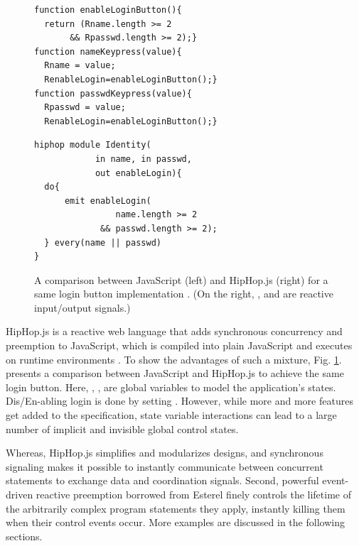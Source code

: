 \documentclass[acmsmall,review,anonymous]{acmart}\settopmatter{printfolios=true,printccs=false,printacmref=false}
\newcommand\figref[1]{Fig. \textcolor{black}{\ref{#1}}.}
\begin{document}
\begin{figure}[h]
\noindent
   \vspace{-2mm}
\begin{varwidth}{.5\textwidth}
\begin{lstlisting}
function enableLoginButton(){
  return (Rname.length >= 2 
	   && Rpasswd.length >= 2);}
function nameKeypress(value){
  Rname = value;
  RenableLogin=enableLoginButton();}
function passwdKeypress(value){ 
  Rpasswd = value;
  RenableLogin=enableLoginButton();}
\end{lstlisting}
\end{varwidth}%
\begin{varwidth}{.5\textwidth}
\begin{lstlisting}
hiphop module Identity(
			in name, in passwd, 
			out enableLogin){
  do{
	  emit enableLogin(
		  		name.length >= 2 
		  	 && passwd.length >= 2); 
  } every(name || passwd)
}
\end{lstlisting}  
\end{varwidth}
      \vspace{0mm}
\caption{A comparison between JavaScript (left) and HipHop.js (right) for a same login button implementation \cite{berry2020hiphop}. (On the right, {}, {} and {} are reactive input/output signals.)}
  \label{fig:login_compare}  
      \vspace{0mm}
\end{figure}





HipHop.js is a reactive web language that adds synchronous concurrency and preemption to JavaScript, which is compiled into plain  JavaScript and executes on runtime environments \cite{berry2020hiphop}. 
To show the advantages of such a mixture, \figref{fig:login_compare} presents a comparison between JavaScript and HipHop.js to achieve the same login button. Here, {}, {}, {} are global variables to model the application's states. Dis/En-abling login is done by setting {}. However, while more and more features get added to the specification, state variable interactions can lead to a large number of implicit and  invisible global control states.


Whereas, HipHop.js simplifies and modularizes designs, and synchronous signaling makes it possible to instantly communicate between concurrent statements to exchange data and coordination signals. 
Second, powerful event-driven reactive preemption borrowed from Esterel finely controls the lifetime of the arbitrarily complex program statements they apply, instantly killing them when their control events occur. 
More examples are discussed in the following sections.
\end{document}
